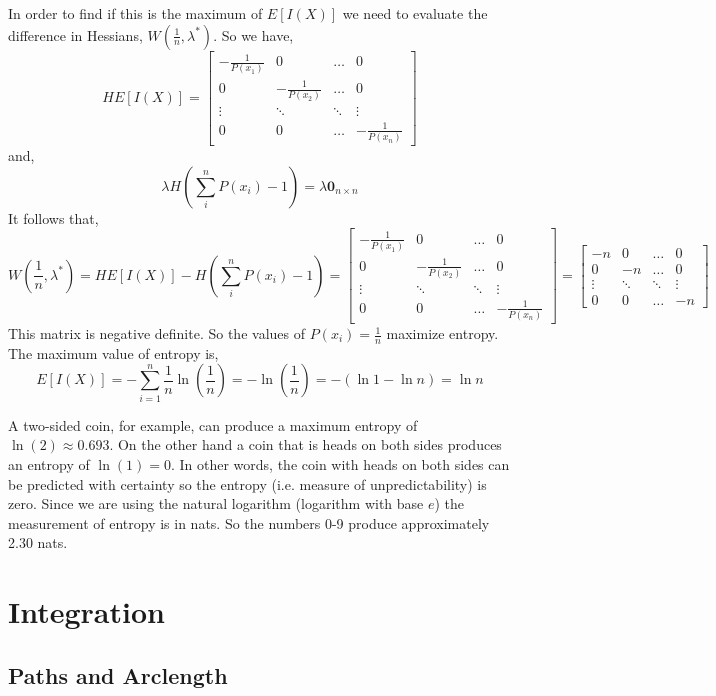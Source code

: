 \documentclass[12pt]{article}
\begin{document}
 In order to find if this is the maximum of $E[I(X)]$ we need to evaluate the difference in Hessians, $W(\frac{1}{n},\lambda^*)$. So we have,
\[
HE[I(X)] = 
\begin{bmatrix}
- \frac{1}{P(x_1)} & 0 & \ldots & 0 \\
0 & - \frac{1}{P(x_2)} & \ldots & 0 \\
\vdots & \ddots & \ddots & \vdots \\
0 & 0 & \dots & - \frac{1}{P(x_n)} 
\end{bmatrix}
\]
and,
\[
\lambda H\left(\sum_{i}^{n} P(x_i)-1\right) = \lambda \mathbf{0}_{n\times n}
\]
It follows that,
\[
W\left(\frac{1}{n},\lambda^*\right) = HE[I(X)] - H\left(\sum_{i}^{n} P(x_i)-1\right) = 
\begin{bmatrix}
- \frac{1}{P(x_1)} & 0 & \ldots & 0 \\
0 & - \frac{1}{P(x_2)} & \ldots & 0 \\
\vdots & \ddots & \ddots & \vdots \\
0 & 0 & \dots & - \frac{1}{P(x_n)} 
\end{bmatrix}
=
\begin{bmatrix}
- n & 0 & \ldots & 0 \\
0 & - n & \ldots & 0 \\
\vdots & \ddots & \ddots & \vdots \\
0 & 0 & \dots & - n 
\end{bmatrix}
\]
This matrix is negative definite. So the values of $P(x_i)= \frac{1}{n}$ maximize entropy. The maximum value of entropy is,
\[
E[I(X)] = -\sum_{i=1}^{n} \frac{1}{n} \ln \left(\frac{1}{n}\right) =  - \ln\left(\frac{1}{n}\right) = -( \ln 1 - \ln n ) = \ln n
\]

 A two-sided coin, for example, can produce a maximum entropy of $\ln(2)\approx 0.693$. On the other hand a coin that is heads on both sides produces an entropy of $\ln(1)=0$. In other words, the coin with heads on both sides can be predicted with certainty so the entropy (i.e. measure of unpredictability) is zero. Since we are using the natural logarithm (logarithm with base $e$) the measurement of entropy is in nats. So the numbers 0-9 produce approximately 2.30 nats. \\
 
\pagebreak
\section{Integration}

\subsection{Paths and Arclength}
\end{document}
